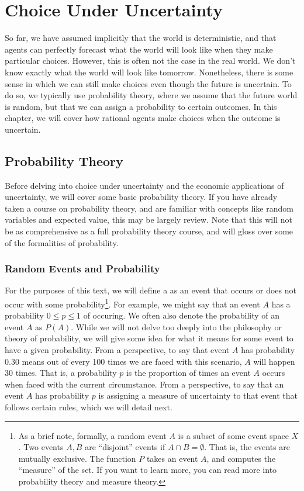 \chapter{Choice Under Uncertainty}
So far, we have assumed implicitly that the world is deterministic, and that agents can perfectly forecast what the world will look like when they make particular choices. However, this is often not the case in the real world. We don't know exactly what the world will look like tomorrow. Nonetheless, there is some sense in which we can still make choices even though the future is uncertain. To do so, we typically use probability theory, where we assume that the future world is random, but that we can assign a probability to certain outcomes. In this chapter, we will cover how rational agents make choices when the outcome is uncertain. 

\section{Probability Theory}
Before delving into choice under uncertainty and the economic applications of uncertainty, we will cover some basic probability theory. If you have already taken a course on probability theory, and are familiar with concepts like random variables and expected value, this may be largely review. Note that this will not be as comprehensive as a full probability theory course, and will gloss over some of the formalities of probability.

\subsection*{Random Events and Probability}
For the purposes of this text, we will define a  as an event that occurs or does not occur with some probability\footnote{
    As a brief note, formally, a random event $A$ is a subset of some event space $X$. Two events $A, B$ are ``disjoint'' events if $A \cap B = \emptyset$. That is, the events are mutually exclusive. The function $P$ takes an event $A$, and computes the ``measure'' of the set. If you want to learn more, you can read more into probability theory and measure theory. 
}. For example, we might say that an event $A$ has a probability $0 \leq p \leq 1$ of occuring. We often also denote the probability of an event $A$ as $P(A)$. While we will not delve too deeply into the philosophy or theory of probability, we will give some idea for what it means for some event to have a given probability. From a  perspective, to say that event $A$ has probability $0.30$ means out of every 100 times we are faced with this scenario, $A$ will happen 30 times. That is, a probability $p$ is the proportion of times an event $A$ occurs when faced with the current circumstance. From a  perspective, to say that an event $A$ has probability $p$ is assigning a measure of uncertainty to that event that follows certain rules, which we will detail next.

